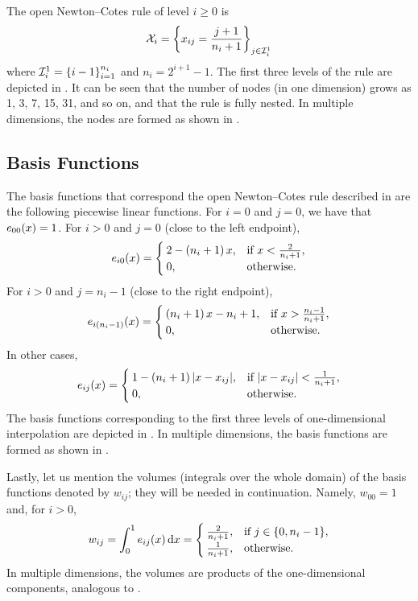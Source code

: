 The open Newton--Cotes rule of level $i \geq 0$ is
\[
  \mathcal{X}_i = \left\{ x_{ij} = \frac{j + 1}{n_i + 1} \right\}_{j \in \mathcal{I}^{1}_{i}}
\]
where $\mathcal{I}^{1}_{i} = \left\{ i - 1 \right\}_{i = 1}^{n_i}$ and $n_i =
2^{i + 1} - 1$. The first three levels of the rule are depicted in .
It can be seen that the number of nodes (in one dimension) grows as 1, 3, 7, 15,
31, and so on, and that the rule is fully nested. In multiple dimensions, the
nodes are formed as shown in .

\subsection{Basis Functions}

The basis functions that correspond the open Newton--Cotes rule described in
 are the following piecewise linear functions. For $i = 0$ and $j =
0$, we have that $e_{00}(x) = 1$. For $i > 0$ and $j = 0$ (close to the left
endpoint),
\[
  e_{i0}(x) =
  \begin{cases}
    2 - \left( n_i + 1 \right) x, & \text{if } x < \frac{2}{n_i + 1}, \\
    0, & \text{otherwise}.
  \end{cases}
\]
For $i > 0$ and $j = n_i - 1$ (close to the right endpoint),
\[
  e_{i(n_i - 1)}(x) =
  \begin{cases}
    \left( n_i + 1 \right) x - n_i + 1, & \text{if } x > \frac{n_i - 1}{n_i + 1}, \\
    0, & \text{otherwise}.
  \end{cases}
\]
In other cases,
\[
  e_{ij}(x) =
  \begin{cases}
    1 - \left( n_i + 1 \right)|x - x_{ij}|, & \text{if } |x - x_{ij}| < \frac{1}{n_i + 1}, \\
    0, & \text{otherwise}.
  \end{cases}
\]
The basis functions corresponding to the first three levels of one-dimensional
interpolation are depicted in . In multiple dimensions, the basis
functions are formed as shown in .

Lastly, let us mention the volumes (integrals over the whole domain) of the
basis functions denoted by $w_{ij}$; they will be needed in continuation.
Namely, $w_{00} = 1$ and, for $i > 0$,
\[
  w_{ij} = \int_0^1 e_{ij}(x) \, \mathrm{d} x =
  \begin{cases}
    \frac{2}{n_i + 1}, & \text{if } j \in \{ 0, n_i - 1 \}, \\
    \frac{1}{n_i + 1}, & \text{otherwise}.
  \end{cases}
\]
In multiple dimensions, the volumes are products of the one-dimensional
components, analogous to .

